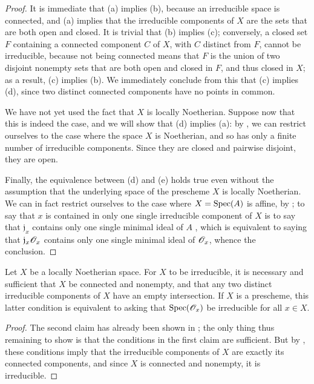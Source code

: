 \begin{proof}
It is immediate that (a) implies (b), because an irreducible space is connected, and (a) implies that the irreducible components of $X$ are the sets that are both open and closed.
It is trivial that (b) implies (c); conversely, a closed set $F$ containing
a connected component $C$ of $X$, with $C$ distinct from $F$, cannot be irreducible, because not being connected means that $F$ is the union of two disjoint nonempty sets that are both open and closed in $F$, and thus closed in $X$; as a result, (c) implies (b).
We immediately conclude from this that (c) implies (d), since two distinct connected components have no points in common.

We have not yet used the fact that $X$ is locally Noetherian.
Suppose now that this is indeed the case, and we will show that (d) implies (a): by , we can restrict ourselves to the case where the space $X$ is Noetherian, and so has only a finite number of irreducible components.
Since they are closed and pairwise disjoint, they are open.

Finally, the equivalence between (d) and (e) holds true even without the assumption that the underlying space of the prescheme $X$ is locally Noetherian.
We can in fact restrict ourselves to the case where $X=\operatorname{Spec}(A)$ is affine, by ;
to say that $x$ is contained in only one single irreducible component of $X$ is to say that $\mathfrak{j}_x$ contains only one single minimal ideal of $A$ , which is equivalent to saying that $\mathfrak{j}_x\mathscr{O}_x$ contains only one single minimal ideal of $\mathscr{O}_x$, whence the conclusion.
\end{proof}

\begin{corollary}[6.1.11]
\label{I.6.1.11}
Let $X$ be a locally Noetherian space.
For $X$ to be irreducible, it is necessary and sufficient that $X$ be connected and nonempty, and that any two distinct irreducible components of $X$ have an empty intersection.
If $X$ is a prescheme, this latter condition is equivalent to asking that $\operatorname{Spec}(\mathscr{O}_x)$ be irreducible for all $x\in X$.
\end{corollary}

\begin{proof}
The second claim has already been shown in ;
the only thing thus remaining to show is that the conditions in the first claim are sufficient.
But by , these conditions imply that the irreducible components of $X$ are exactly its connected components, and since $X$ is connected and nonempty, it is irreducible.
\end{proof}

